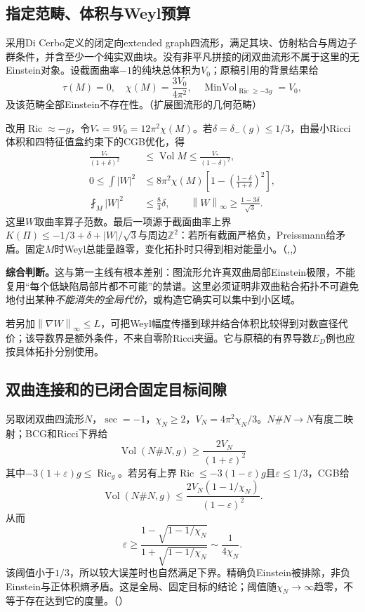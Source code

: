 \documentclass[UTF8,fontset=fandol,zihao=-4]{ctexart}
\theoremstyle{research}
\DeclareMathOperator{\Ric}{Ric}
\DeclareMathOperator{\Vol}{Vol}
\newcommand{\Z}{\mathbb Z}
\newcommand{\norm}[1]{\left\|#1\right\|}
\numberwithin{equation}{section}
\begin{document}
\subsection{指定范畴、体积与Weyl预算}
采用Di Cerbo定义的闭定向extended graph四流形，满足其块、仿射粘合与周边子群条件，并含至少一个纯实双曲块。没有非平凡拼接的闭双曲流形不属于这里的无Einstein对象。设截面曲率$-1$的纯块总体积为$V_0$；原稿引用的背景结果给
\[
\tau(M)=0,\quad\chi(M)=\frac{3V_0}{4\pi^2},
\quad\operatorname{MinVol}_{\Ric\ge-3g}=V_0,
\]
及该范畴全部Einstein不存在性。\cite{G}（扩展图流形的几何范畴）\cite{DiCerbo}

改用$\Ric\approx-g$，令$V_*=9V_0=12\pi^2\chi(M)$。若$\delta=\delta_-(g)\le1/3$，由最小Ricci体积和四特征值盒约束下的CGB优化，得
\begin{align}
\frac{V_*}{(1+\delta)^2}&\le\Vol M\le\frac{V_*}{(1-\delta)^2},\\
0\le\int|W|^2&\le8\pi^2\chi(M)
\left[1-\left(\frac{1-\delta}{1+\delta}\right)^2\right],\\
\fint_M|W|^2&\le\frac83\delta,
\qquad\norm W_\infty\ge\frac{1-3\delta}{\sqrt3}.
\end{align}
这里$W$取曲率算子范数。最后一项源于截面曲率上界$K(\Pi)\le-1/3+\delta+|W|/\sqrt3$与周边$\Z^2$：若所有截面严格负，Preissmann给矛盾。固定$M$时Weyl总能量趋零，变化拓扑时只得到相对能量小。\cite{G}（,,）

\textbf{综合判断。}这与第一主线有根本差别：图流形允许真双曲局部Einstein极限，不能复用“每个低缺陷局部片都不可能”的禁谱。这里必须证明非双曲粘合拓扑不可避免地付出某种\emph{不能消失的全局代价}，或构造它确实可以集中到小区域。

若另加$\norm{\nabla W}_\infty\le L$，可把Weyl幅度传播到球并结合体积比较得到对数直径代价；该导数界是额外条件，不来自零阶Ricci夹逼。它与原稿的有界导数$E_D$例也应按具体拓扑分别使用。

\subsection{双曲连接和的已闭合固定目标间隙}
另取闭双曲四流形$N$，$\sec=-1$，$\chi_N\ge2$，$V_N=4\pi^2\chi_N/3$。$N\#N\to N$有度二映射；BCG和Ricci下界给
\[
\Vol(N\#N,g)\ge\frac{2V_N}{(1+\varepsilon)^2}
\]
其中$-3(1+\varepsilon)g\le\Ric_g$。若另有上界$\Ric\le-3(1-\varepsilon)g$且$\varepsilon\le1/3$，CGB给
\[
\Vol(N\#N,g)\le\frac{2V_N(1-1/\chi_N)}{(1-\varepsilon)^2}.
\]
从而
\[
\boxed{\varepsilon\ge
\frac{1-\sqrt{1-1/\chi_N}}{1+\sqrt{1-1/\chi_N}}
\sim\frac1{4\chi_N}.}
\]
该阈值小于$1/3$，所以较大误差时也自然满足下界。精确负Einstein被排除，非负Einstein与正体积熵矛盾。这是全局、固定目标的结论；阈值随$\chi_N\to\infty$趋零，不等于存在达到它的度量。\cite{G}（）\cite{BCG}
\end{document}
